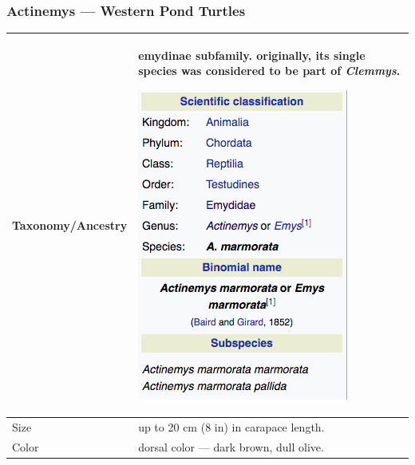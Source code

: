 \subsubsection{Actinemys --- Western Pond Turtles}
\begin{center}
\begin{longtabu} to 

	\hline
	Taxonomy/Ancestry &
	emydinae subfamily. originally, its single species was considered to be part of \emph{Clemmys}.
	
	\begin{center} \includegraphics[scale=0.5]{testudines/emydidae/actinemys/tax} \end{center}
	 \\
	\hline
	Size & 
	up to 20 cm (8 in) in carapace length.
	\\
	\hline
	Color &
	dorsal color --- dark brown, dull olive.
	

\end{longtabu}
\end{center}
